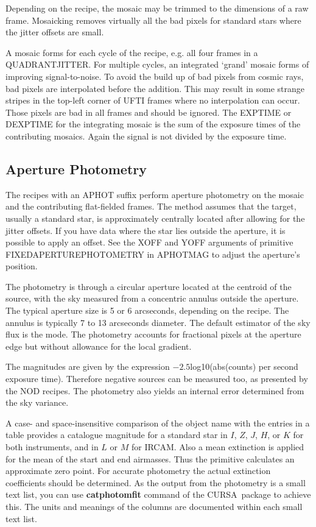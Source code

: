 \documentclass[twoside,11pt]{article}
\newcommand{\xref}[3]{#1}
\newcommand{\xlabel}[1]{}
\renewcommand{\_}{\texttt{\symbol{95}}}
\newcommand{\lsk}{\raisebox{-0.4ex}{\rm *}}
\newcommand{\CURSA}{{\footnotesize CURSA}}
\begin{document}
Depending on the recipe, the mosaic may be trimmed to the dimensions
of a raw frame.  Mosaicking removes virtually all the bad pixels for
standard stars where the jitter offsets are small.

A mosaic forms for each cycle of the recipe, e.g. all four frames in a
QUADRANT\_JITTER.  For multiple cycles, an integrated `grand' mosaic
forms of improving signal-to-noise.  To avoid the build up of bad
pixels from cosmic rays, bad pixels are interpolated before the
addition.  This may result in some strange stripes in the top-left
corner of UFTI frames where no interpolation can occur.  Those pixels
are bad in all frames and should be ignored.  The EXP\_TIME or
DEXPTIME for the integrating mosaic is the sum of the exposure times
of the contributing mosaics.  Again the signal is not divided by the
exposure time.

\subsection{\xlabel{aperture_photometry}Aperture
Photometry\label{aperture_photometry}}

The recipes with an \_APHOT suffix perform aperture photometry on
the mosaic and the contributing flat-fielded frames.  The method
assumes that the target, usually a standard star, is approximately
centrally located after allowing for the jitter offsets.  If you have
data where the star lies outside the aperture, it is possible to
apply an offset.  See the XOFF and YOFF arguments of primitive
\_FIXED\_APERTURE\_PHOTOMETRY\_ in \_APHOT\_MAG\_ to adjust the
aperture's position.

The photometry is through a circular aperture located at the centroid
of the source, with the sky measured from a concentric annulus outside
the aperture.  The typical aperture size is 5 or 6 arcseconds,
depending on the recipe.  The annulus is typically 7 to 13 arcseconds
diameter.  The default estimator of the sky flux is the mode.  The
photometry accounts for fractional pixels at the aperture edge but
without allowance for the local gradient.

The magnitudes are given by the expression $-2.5 $\lsk$ $log10(abs(counts)
per second exposure time).  Therefore negative sources can be
measured too, as presented by the NOD recipes.  The photometry also
yields an internal error determined from the sky variance. 

A case- and space-insensitive comparison of the object name with the
entries in a table provides a catalogue magnitude for a standard star
in $I$, $Z$, $J$, $H$, or $K$ for both instruments, and in $L$ or $M$
for IRCAM.  Also a mean extinction is applied for the mean
of the start and end airmasses.  Thus the primitive calculates an
approximate zero point.  For accurate photometry the actual extinction
coefficients should be determined.  As the output from the photometry
is a \xref{small text list}{sun190}{STLREF}, you can use
\xref{{\bf catphotomfit} command}{sun190}{PHOTCAL} of the \CURSA\ package
to achieve this.  The units and meanings of the columns are documented
within each small text list.
\end{document}
